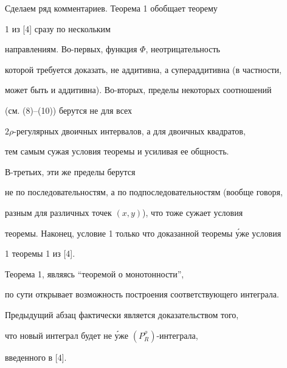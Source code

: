 Сделаем ряд комментариев. Теорема 1 обобщает теорему


1 из [4] сразу по нескольким


направлениям. Во-первых, функция $\Phi $, неотрицательность


которой требуется доказать, не аддитивна, а супераддитивна (в частности,


может быть и аддитивна). Во-вторых, пределы некоторых соотношений


(см. (8)--(10)) берутся не для всех


$2\rho $-регулярных двоичных интервалов, а для двоичных квадратов,


тем самым сужая условия теоремы и усиливая ее общность. 


В-третьих, эти же пределы берутся


не по последовательностям, а по подпоследовательностям (вообще говоря,


разным для различных точек $(x,y)$), что тоже сужает условия


теоремы. Наконец, условие 1 только что доказанной теоремы \'уже условия


1 теоремы 1 из [4].





Теорема 1, являясь ``теоремой о монотонности'',


по сути открывает возможность построения соответствующего интеграла.


Предыдущий абзац фактически является доказательством того,


что новый интеграл будет не \'уже $(P^{\rho }_{R})$-интеграла,


введенного в [4]. 





